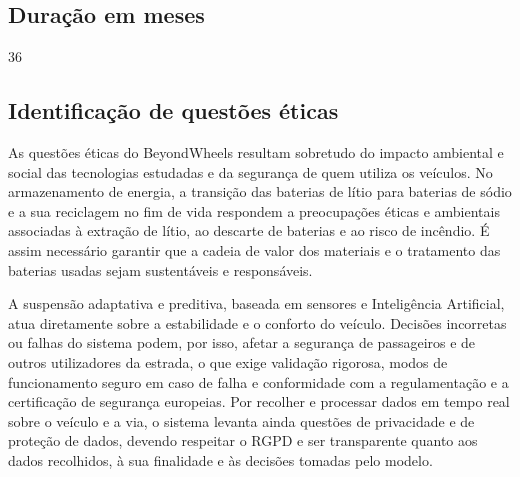 \subsection{Duração em meses}
\begin{campotexto}
36
\end{campotexto}

\subsection{Identificação de questões éticas}
\begin{campotexto}
As questões éticas do BeyondWheels resultam sobretudo do impacto ambiental e
social das tecnologias estudadas e da segurança de quem utiliza os veículos.
No armazenamento de energia, a transição das baterias de lítio para baterias de
sódio e a sua reciclagem no fim de vida respondem a preocupações éticas e
ambientais associadas à extração de lítio, ao descarte de baterias e ao risco de
incêndio. É assim necessário garantir que a cadeia de valor dos materiais e o
tratamento das baterias usadas sejam sustentáveis e responsáveis.

A suspensão adaptativa e preditiva, baseada em sensores e Inteligência
Artificial, atua diretamente sobre a estabilidade e o conforto do veículo.
Decisões incorretas ou falhas do sistema podem, por isso, afetar a segurança de
passageiros e de outros utilizadores da estrada, o que exige validação rigorosa,
modos de funcionamento seguro em caso de falha e conformidade com a
regulamentação e a certificação de segurança europeias. Por recolher e
processar dados em tempo real sobre o veículo e a via, o sistema levanta ainda
questões de privacidade e de proteção de dados, devendo respeitar o RGPD e ser
transparente quanto aos dados recolhidos, à sua finalidade e às decisões
tomadas pelo modelo.
\end{campotexto}

